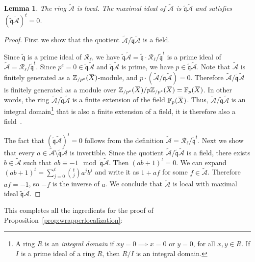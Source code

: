 \documentclass[letterpaper, 11pt, thm-restate]{article}
\numberwithin{equation}{section}
\newcommand{\F}{\mathbb{F}}
\newcommand{\Zpe}{\mathbb{Z}_{/p^e}}
\newcommand{\mR}{\mathcal{R}}
\newcommand{\tmA}{\widetilde{\mathcal{A}}}
\newcommand{\oX}{\mkern 1.5mu\overline{\mkern-1.5mu X \mkern-1.5mu}\mkern 1.5mu}
\newcommand{\tfrq}{\widetilde{\mathfrak{q}}}
\newtheorem{lem}[thrm]{Lemma}
\theoremstyle{definition}
\theoremstyle{definition}
\theoremstyle{definition}
\begin{document}
\begin{lem}\label{lem:local}
    The ring $\tmA$ is local. The maximal ideal of $\tmA$ is $\tfrq\tmA$ and satisfies $(\tfrq\tmA)^t = 0$.
\end{lem}
\begin{proof}
    First we show that the quotient $\tmA/\tfrq \tmA$ is a field.

    Since $\tfrq$ is a prime ideal of $\mR_{\ell}$, 
    we have $\tfrq \tmA = \tfrq \cdot \mR_{\ell}/\tfrq^{t}$ is a prime ideal of $\tmA = \mR_{\ell}/\tfrq^{t}$.
    Since $p^e = 0 \in \tfrq \tmA$ and $\tfrq \tmA$ is prime, we have $p \in \tfrq \tmA$.
    Note that $\tmA$ is finitely generated as a $\Zpe(\oX)$-module, and $p \cdot (\tmA/\tfrq \tmA) = 0$.
    Therefore $\tmA/\tfrq \tmA$ is finitely generated as a module over $\Zpe(\oX)/p\Zpe(\oX) = \F_p(\oX)$.
    In other words, the ring $\tmA/\tfrq \tmA$ is a finite extension of the field $\F_p(\oX)$.
    Thus, $\tmA/\tfrq \tmA$ is an integral domain\footnote{A ring $R$ is an \emph{integral domain} if $xy = 0 \implies x = 0 \text{ or } y = 0$, for all $x, y \in R$. If $I$ is a prime ideal of a ring $R$, then $R/I$ is an integral domain.} that is also a finite extension of a field, it is therefore also a field~\cite[Corollary~4.7]{eisenbud2013commutative}.

    The fact that $(\tfrq\tmA)^{t} = 0$ follows from the definition $\tmA = \mR_{\ell}/\tfrq^t$.
    Next we show that every $a \in \tmA \setminus \tfrq \tmA$ is invertible. Since the quotient $\tmA/\tfrq \tmA$ is a field, there exists $b \in \tmA$ such that $ab \equiv -1 \mod \tfrq \tmA$. Then $(ab + 1)^{t} = 0$.
    We can expand $(ab + 1)^{t} = \sum_{j = 0}^{t} \binom{t}{j} a^j b^j$ and write it as $1 + af$ for some $f \in \tmA$.
    Therefore $af = -1$, so $-f$ is the inverse of $a$.
    We conclude that $\tmA$ is local with maximal ideal $\tfrq\tmA$.
\end{proof}

This completes all the ingredients for the proof of Proposition~\ref{prop:wrapperlocalization}:
\end{document}

